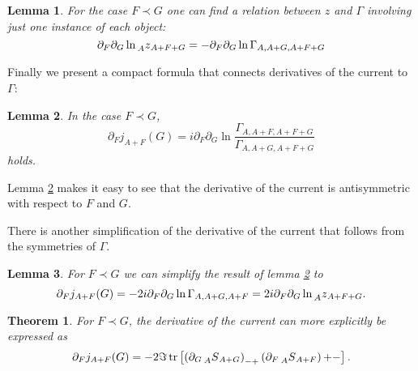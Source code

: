 \documentclass[oneside,reqno,12pt]{amsart}
\newtheorem{Thm}[Def]{Theorem}
\newtheorem{lemma}{Lemma}
\DeclareMathOperator{\tr}{tr}
\begin{document}
\begin{lemma}\label{lemma:z_gamma_causal}
For the case \(F\prec G\) one can find a relation between \(z\) and \(\Gamma\) involving just one instance of each object:
\begin{equation}
\partial_F \partial_G \ln \prescript{}{A}{z}_{A+F+G} = - \partial_F \partial_G \ln \Gamma_{A,A+G,A+F+G}
\end{equation}

\end{lemma}

Finally we present a compact formula that connects derivatives of the current to \(\Gamma\):
\begin{lemma}\label{lemma:current_causal}
In the case \(F\prec G\),
\begin{equation}
\partial_F j_{A+F}(G)= i \partial_F \partial_G \ln \frac{\Gamma_{A,A+F,A+F+G}}{\Gamma_{A,A+G,A+F+G}}
\end{equation}
holds.
\end{lemma}
Lemma \ref{lemma:current_causal} makes it easy to see that the derivative of the current is antisymmetric with respect to \(F\) and \(G\).

There is another simplification of the derivative of the current that follows from the symmetries of \(\Gamma\).
\begin{lemma}\label{lemma:current_compact}
For \(F\prec G\) we can simplify the result of lemma \ref{lemma:current_causal} to
\begin{equation}
\partial_F j_{A+F}(G)=- 2 i \partial_F \partial_G \ln \Gamma_{A,A+G,A+F} = 2 i \partial_F \partial_G \ln \prescript{}{A}{z}_{A+F+G}.
\end{equation}
\end{lemma}

\begin{Thm}\label{thm:current_explicit}
For \(F\prec G\), the derivative of the current can more explicitly be expressed as
\begin{equation}
\partial_F j_{A+F}(G)= -2  \Im \tr\left[ \left( \partial_G \prescript{}{A}{S}_{A+G}\right)_{-+} \left( \partial_F \prescript{}{A}{S}_{A+F}\right){+-}\right].
\end{equation}


\end{Thm}
\end{document}
